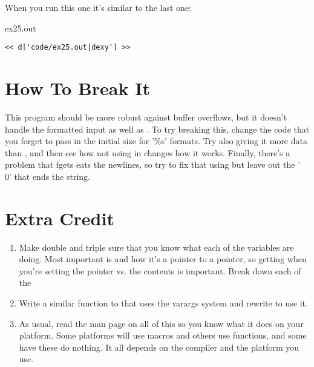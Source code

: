 When you run this one it's similar to the last one:

\begin{code}{ex25.out}
\begin{lstlisting}
<< d['code/ex25.out|dexy'] >>
\end{lstlisting}
\end{code}

\section{How To Break It}

This program should be more robust against buffer overflows, but it doesn't
handle the formatted input as well as .  To try breaking this,
change the code that you forget to pass in the initial size for '\%s' formats.
Try also giving it more data than , and then see how not
using  in  changes how it works.  Finally,
there's a problem that fgets eats the newlines, so try to fix that using
 but leave out the '\\0' that ends the string.

\section{Extra Credit}

\begin{enumerate}
\item Make double and triple sure that you know what each of the 
    variables are doing.  Most important is  and how it's
    a pointer to a pointer, so getting when you're setting the pointer vs. the
    contents is important.  Break down each of the 
\item Write a similar function to  that uses the varargs system
    and rewrite  to use it.
\item As usual, read the man page on all of this so you know what it does
    on your platform.  Some platforms will use macros and others use
    functions, and some have these do nothing.  It all depends on the 
    compiler and the platform you use.
\end{enumerate}

